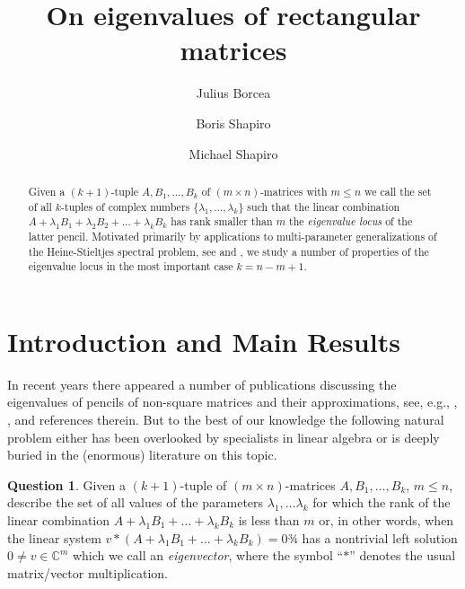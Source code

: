 \documentclass[10pt,twoside,a4paper,reqno]{amsart}
\theoremstyle{plain}
\theoremstyle{definition}
\newtheorem*{question}       {Question}
\theoremstyle{remark}
\begin{document}

\title[Eigenvalues of rectangular matrices]{On eigenvalues of rectangular
matrices}
\author[J.~Borcea]{Julius Borcea}
\address{Department of Mathematics, Stockholm University, SE-106 91 Stockholm,
   Sweden}
\author[B.~Shapiro]{Boris Shapiro}
\address{Department of Mathematics, Stockholm University, SE-106 91 Stockholm,
   Sweden}
\author[M.~Shapiro]{Michael Shapiro}
\address{Department of Mathematics, Michigan State University, East
Lansing, MI 48824-1027, USA}


\begin{abstract}
Given a $(k+1)$-tuple  $A, B_1,\ldots, B_k$  of $(m\times n)$-matrices  with $m\le n$ we call the set of all $k$-tuples  of complex numbers $\{{\lambda}_1,\ldots,{\lambda}_k\}$ such that the linear combination $A+{\lambda}_1B_1+{\lambda}_2B_2+\ldots+{\lambda}_kB_k$ has rank smaller than $m$ the {\it eigenvalue locus} of the latter pencil.  Motivated primarily by applications to multi-parameter generalizations of the Heine-Stieltjes spectral problem, see \cite {He} and  \cite {Vol}, we study   a number of  properties of the eigenvalue locus in the most important  case $k=n-m+1$.
\end{abstract}

\maketitle

\section*{Introduction and Main Results}  In recent years there appeared a  number of publications discussing the eigenvalues  of pencils of non-square matrices and their approximations, see, e.g., \cite{BEGM}, \cite{CG}, \cite{TW} and references therein.  But to the best of our knowledge the following natural problem either has been overlooked by specialists in linear algebra or is deeply buried in the (enormous) literature on this topic.

\begin{question}
Given a $(k+1)$-tuple of $(m\times n)$-matrices $A, B_1,\ldots, B_k$, $m\le n$, describe the set of all values of the parameters ${\lambda}_1,\ldots{\lambda}_k$ for which the rank of the linear combination $A+{\lambda}_1B_1+\ldots+{\lambda}_kB_k$ is less than $m$ or, in other words, when the linear system   $v*(A+{\lambda}_1B_1+\ldots+{\lambda}_kB_k)=0$¾  has a nontrivial left solution $0\neq v\in {\mathbb {C}}^m$ which we call an {\em eigenvector}, where the symbol ``$*$'' denotes the usual matrix/vector multiplication.
\end{question}
\end{document}

